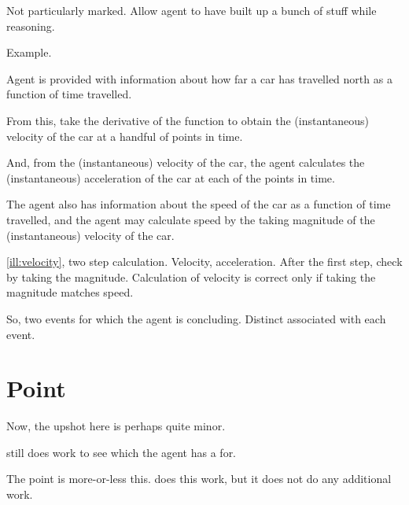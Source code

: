 \begin{note}
  Not particularly marked.
  Allow agent to have built up a bunch of stuff while reasoning.

  Example.

  \begin{illustration}[Velocity]
    \label{ill:velocity}
    Agent is provided with information about how far a car has travelled north as a function of time travelled.

    From this, take the derivative of the function to obtain the (instantaneous) velocity of the car at a handful of points in time.

    And, from the (instantaneous) velocity of the car, the agent calculates the (instantaneous) acceleration of the car at each of the points in time.

    The agent also has information about the speed of the car as a function of time travelled, and the agent may calculate speed by the taking magnitude of the (instantaneous) velocity of the car.
  \end{illustration}

  \autoref{ill:velocity}, two step calculation.
  Velocity, acceleration.
  After the first step, check by taking the magnitude.
  Calculation of velocity is correct only if taking the magnitude matches speed.

  So, two events for which the agent is concluding.
  Distinct  associated with each event.
\end{note}


\section{Point}
\label{sec:point}

\begin{note}
  Now, the upshot here is perhaps quite minor.

  \issueConstraint{} still does work to see which \ros{} the agent has a \wit{} for.

  The point is more-or-less this.
  \issueConstraint{} does this work, but it does not do any additional work.
\end{note}


